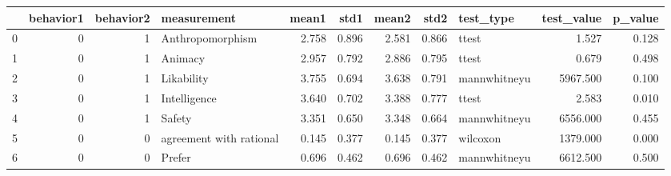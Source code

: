 \begin{tabular}{lrrlrrrrlrr}
\toprule
{} &  behavior1 &  behavior2 &              measurement &  mean1 &   std1 &  mean2 &   std2 &     test\_type &  test\_value &  p\_value \\
\midrule
0 &          0 &          1 &         Anthropomorphism &  2.758 &  0.896 &  2.581 &  0.866 &         ttest &       1.527 &    0.128 \\
1 &          0 &          1 &                  Animacy &  2.957 &  0.792 &  2.886 &  0.795 &         ttest &       0.679 &    0.498 \\
2 &          0 &          1 &               Likability &  3.755 &  0.694 &  3.638 &  0.791 &  mannwhitneyu &    5967.500 &    0.100 \\
3 &          0 &          1 &             Intelligence &  3.640 &  0.702 &  3.388 &  0.777 &         ttest &       2.583 &    0.010 \\
4 &          0 &          1 &                   Safety &  3.351 &  0.650 &  3.348 &  0.664 &  mannwhitneyu &    6556.000 &    0.455 \\
5 &          0 &          0 &  agreement with rational &  0.145 &  0.377 &  0.145 &  0.377 &      wilcoxon &    1379.000 &    0.000 \\
6 &          0 &          0 &                   Prefer &  0.696 &  0.462 &  0.696 &  0.462 &  mannwhitneyu &    6612.500 &    0.500 \\
\bottomrule
\end{tabular}
